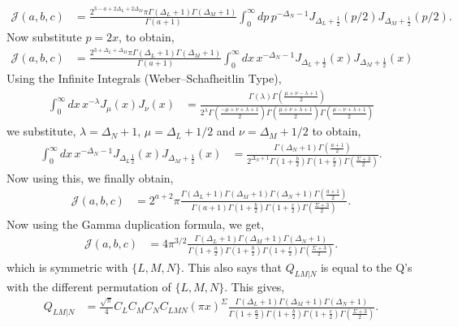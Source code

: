 \documentclass[11pt]{article}
\newcommand{\lb}{\left(}
\newcommand{\rb}{\right)}
\begin{document}
\begin{align}
    \mathcal{J}(a,b,c)&=\frac{2^{3-a +2\Delta_L + 2\Delta_M}\pi \Gamma(\Delta_L +1)\Gamma(\Delta_M+1)}{\Gamma(a+1)}\int_0^\infty dp \,p^{-\Delta_N - 1} J_{\Delta_L + \frac{1}{2}}(p/2) J_{\Delta_M+\frac{1}{2}}(p/2).
\end{align}
Now substitute $p=2x$, to obtain,
\begin{align}
    \mathcal{J}(a,b,c)&= \frac{2^{3+\Delta_L + \Delta_M}\pi \Gamma(\Delta_L +1)\Gamma(\Delta_M+1)}{\Gamma(a+1)} \int_0^\infty dx\, x^{-\Delta_N -1} J_{\Delta_L + \frac{1}{2}}(x)J_{\Delta_M + \frac{1}{2}}(x)
\end{align}
Using the Infinite Integrals (Weber–Schafheitlin Type),
\begin{align}
    \int_0^\infty dx \, x^{-\lambda} J_\mu(x) J_\nu(x) &= \frac{\Gamma(\lambda) \Gamma\lb \frac{\mu + \nu -\lambda +1}{2}\rb}{2^\lambda \Gamma\lb \frac{-\mu + \nu +\lambda +1}{2}\rb\Gamma\lb \frac{\mu + \nu +\lambda +1}{2}\rb\Gamma\lb \frac{\mu - \nu +\lambda +1}{2}\rb}
\end{align}
we substitute, $\lambda = \Delta_N +1$, $\mu = \Delta_L +1/2$ and $\nu = \Delta_M + 1/2$ to obtain,
\begin{align}
    \int_0^\infty dx\, x^{-\Delta_N-1} J_{\Delta_L \frac{1}{2}}(x)J_{\Delta_M + \frac{1}{2}}(x) &= \frac{\Gamma(\Delta_N + 1)\Gamma\lb \frac{a+1}{2}\rb}{2^{\Delta_N + 1}\Gamma\lb 1+\frac{b}{2}\rb\Gamma\lb 1+\frac{c}{2}\rb\Gamma\lb \frac{\Sigma+3}{2}\rb}.
\end{align}
Now using this, we finally obtain,
\begin{align}
    \mathcal{J}(a,b,c)&= 2^{a+2}\pi \frac{\Gamma(\Delta_L + 1)\Gamma(\Delta_M + 1)\Gamma(\Delta_N + 1)\Gamma\lb\frac{a+1}{2}\rb}{\Gamma(a + 1)\Gamma\lb 1+ \frac{b}{2}\rb\Gamma\lb 1+ \frac{c}{2}\rb\Gamma\lb  \frac{\Sigma + 3}{2}\rb}.
\end{align}
Now using the Gamma duplication formula, we get,
\begin{align}
    \mathcal{J}(a,b,c)&= 4\pi^{3/2} \frac{\Gamma(\Delta_L + 1)\Gamma(\Delta_M + 1)\Gamma(\Delta_N + 1)}{\Gamma\lb 1+ \frac{a}{2}\rb\Gamma\lb 1+ \frac{b}{2}\rb\Gamma\lb 1+ \frac{c}{2}\rb\Gamma\lb  \frac{\Sigma + 3}{2}\rb}.
\end{align}
which is symmetric with $\{L,M,N\}$. This also says that $Q_{LM|N}$ is equal to the Q's with the different permutation of $\{L,M,N\}$.
This gives,
\begin{align}
    Q_{LM|N}&= \frac{\sqrt \pi}{4}C_LC_MC_NC_{LMN} (\pi x)^{\Sigma}\frac{\Gamma(\Delta_L + 1)\Gamma(\Delta_M + 1)\Gamma(\Delta_N + 1)}{\Gamma\lb 1+ \frac{a}{2}\rb\Gamma\lb 1+ \frac{b}{2}\rb\Gamma\lb 1+ \frac{c}{2}\rb\Gamma\lb  \frac{\Sigma + 3}{2}\rb}. 
\end{align}
\end{document}
